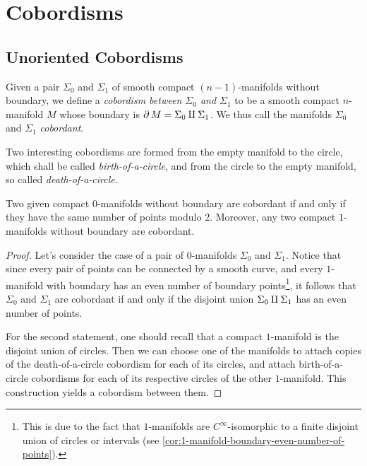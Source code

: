 \section{Cobordisms}

\subsection{Unoriented Cobordisms}

\begin{definition}
\label{def:unoriented-cobordism}
Given a pair \(\Sigma_0\) and \(\Sigma_1\) of smooth compact
\((n-1)\)-manifolds without boundary, we define a \emph{cobordism between
  \(\Sigma_0\) and \(\Sigma_1\)} to be a smooth compact \(n\)-manifold \(M\)
whose boundary is \(\operatorname{\partial} M = \Sigma_0 \amalg \Sigma_1\). We thus call the
manifolds \(\Sigma_0\) and \(\Sigma_1\) \emph{cobordant}.
\end{definition}

\begin{example}
\label{exp:birth-death-circle}
Two interesting cobordisms are formed from the empty manifold to the circle,
which shall be called \emph{birth-of-a-circle}, and from the circle to the empty
manifold, so called \emph{death-of-a-circle}.
\end{example}

\begin{lemma}
\label{lem:cobordant-0-and-1-manifolds}
Two given compact \(0\)-manifolds without boundary are cobordant if and only if
they have the same number of points modulo \(2\). Moreover, any two compact
\(1\)-manifolds without boundary are cobordant.
\end{lemma}

\begin{proof}
Let's consider the case of a pair of \(0\)-manifolds \(\Sigma_0\) and
\(\Sigma_1\). Notice that since every pair of points can be connected by a
smooth curve, and every \(1\)-manifold with boundary has an even number of
boundary points\footnote{This is due to the fact that \(1\)-manifolds are
  \(C^{\infty}\)-isomorphic to a finite disjoint union of circles or intervals
  (see \cref{cor:1-manifold-boundary-even-number-of-points}).}, it follows that
\(\Sigma_0\) and \(\Sigma_1\) are cobordant if and only if the disjoint union
\(\Sigma_0 \amalg \Sigma_1\) has an even number of points.

For the second statement, one should recall that a compact \(1\)-manifold is the
disjoint union of circles. Then we can choose one of the manifolds to
attach copies of the death-of-a-circle cobordism for each of its circles, and
attach birth-of-a-circle cobordisms for each of its respective
circles of the other \(1\)-manifold. This construction yields a cobordism
between them.
\end{proof}

